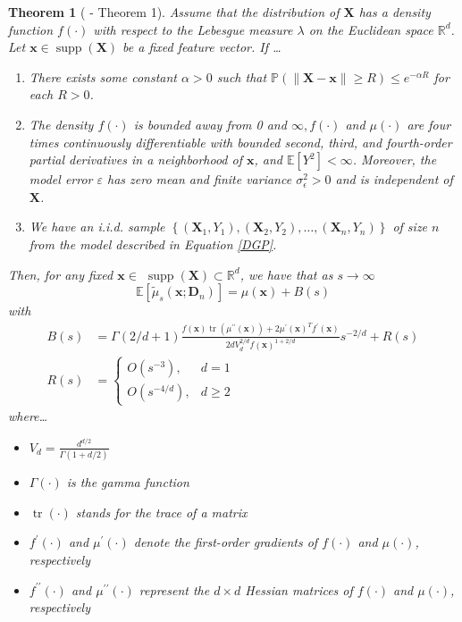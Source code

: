 \documentclass[letterpaper,10pt]{article}
\numberwithin{equation}{section}
\newtheorem{thm}{Theorem}
\numberwithin{thm}{section}
\newcommand{\1}{\mathbb{1}}
\begin{document}
\vspace{0.5cm}
\begin{thm}[\citet{demirkaya_optimal_2024} - Theorem 1]\label{demirkaya_Thm1}
	Assume that the distribution of $\mathbf{X}$ has a density function $f(\cdot)$ with respect to the Lebesgue measure $\lambda$ on the Euclidean space $\mathbb{R}^d$.
	Let $\mathbf{x} \in \operatorname{supp}(\mathbf{X})$ be a fixed feature vector.
	If \dots
	\begin{enumerate}
		\item There exists some constant $\alpha>0$ such that $\mathbb{P}(\|\mathbf{X}-\mathbf{x}\| \geq R) \leq e^{-\alpha R}$ for each $R>0$.
		\item The density $f(\cdot)$ is bounded away from 0 and $\infty, f(\cdot)$ and $\mu(\cdot)$ are four times continuously differentiable with bounded second, third, and fourth-order partial derivatives in a neighborhood of $\mathbf{x}$, and $\mathbb{E}[Y^2]<\infty$.
		      Moreover, the model error $\varepsilon$ has zero mean and finite variance $\sigma_\epsilon^2>0$ and is independent of $\mathbf{X}$.
		\item We have an i.i.d. sample $\left\{\left(\mathbf{X}_1, Y_1\right),\left(\mathbf{X}_2, Y_2\right), \dotsc,\left(\mathbf{X}_n, Y_n\right)\right\}$ of size $n$ from the model described in Equation \ref{DGP}.
	\end{enumerate}
	Then, for any fixed $\mathbf{x} \in$ $\operatorname{supp}(\mathbf{X}) \subset \mathbb{R}^d$, we have that as $s \rightarrow \infty$
	\begin{equation}
		\mathbb{E}\left[\tilde{\mu}_{s}(\mathbf{x}; \mathbf{D}_n)\right] = \mu(\mathbf{x})+B(s)
	\end{equation}
	with
	\begin{align*}
		B(s) & =\Gamma(2 / d+1) \frac{f(\mathbf{x}) \operatorname{tr}\left(\mu^{\prime \prime}(\mathbf{x})\right)+2 \mu^{\prime}(\mathbf{x})^T f^{\prime}(\mathbf{x})}{2 d V_d^{2 / d} f(\mathbf{x})^{1+2 / d}} s^{-2 / d}+R(s) \\
		R(s) & = \begin{cases}O\left(s^{-3}\right),     & d=1      \\
             O\left(s^{-4 / d}\right), & d \geq 2\end{cases}
	\end{align*}
	where\dots
	\begin{multicols*}{2}
		\begin{itemize}
			\item $V_d=\frac{d^{d / 2}}{\Gamma(1+d / 2)}$
			\item $\Gamma(\cdot)$ is the gamma function
			\item $\operatorname{tr}(\cdot)$ stands for the trace of a matrix
			\item $f^{\prime}(\cdot)$ and $\mu^{\prime}(\cdot)$ denote the first-order gradients of $f(\cdot)$ and $\mu(\cdot)$, respectively
			\item $f^{\prime \prime}(\cdot)$ and $\mu^{\prime \prime}(\cdot)$ represent the $d \times d$ Hessian matrices of $f(\cdot)$ and $\mu(\cdot)$, respectively
		\end{itemize}
	\end{multicols*}
\end{thm}
\end{document}
